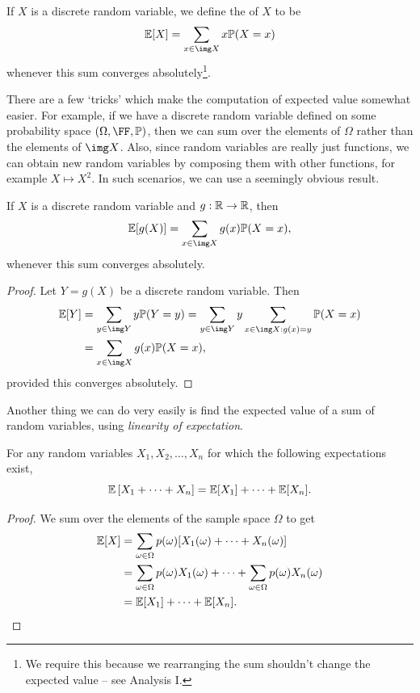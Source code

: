\documentclass[a4paper]{scrartcl}
\begin{document}
\begin{definition}
	If $X$ is a discrete random variable, we define the  of $X$ to be
	$$
\EE[X] = \sum_{x \in \img X} x \PP(X = x)
	$$
	whenever this sum converges absolutely\footnote{We require this because we rearranging the sum shouldn't change the expected value -- see Analysis I.}.
\end{definition}

There are a few `tricks' which make the computation of expected value somewhat easier. For example, if we have a discrete random variable defined on some probability space $(\Omega, \FF, \PP)$, then we can sum over the elements of $\Omega$ rather than the elements of $\img X$.
Also, since random variables are really just functions, we can obtain new random variables by composing them with other functions, for example $X \mapsto X^2$. In such scenarios, we can use a seemingly obvious result.

\begin{theorem}
	If $X$ is a discrete random variable and $g: \mathbb{R} \rightarrow \mathbb{R}$, then
	$$
\EE[g(X)] = \sum_{x \in \img X} g(x) \PP(X = x),
	$$
	whenever this sum converges absolutely.
\end{theorem}
\begin{proof}
	Let $Y = g(X)$ be a discrete random variable. Then
	\begin{align*}
		\EE[Y] &= \sum_{y \in \img Y} y \PP(Y = y) = \sum_{y \in \img Y} y \sum_{x \in \img X : g(x) = y} \PP(X = x)  \\
		&= \sum_{x \in \img X} g(x) \PP(X = x),
	\end{align*}
	provided this converges absolutely.
\end{proof}

Another thing we can do very easily is find the expected value of a sum of random variables, using \emph{linearity of expectation}.

\begin{theorem}
	For any random variables $X_1, X_2, \dots, X_n$ for which the following expectations exist,
	$$
\mathbb{E}\left[X_1 + \cdots + X_n\right]= \mathbb{E}[X_1] + \cdots + \mathbb{E}[X_n].
	$$
\end{theorem}
\begin{proof}
	We sum over the elements of the sample space $\Omega$ to get
	\begin{align*}
		\mathbb{E}[X] &= \sum_{\omega \in \Omega} p(\omega)[X_1(\omega) + \cdots + X_n(\omega)]\\
		&= \sum_{\omega \in \Omega} p(\omega) X_1(\omega) + \cdots + \sum_{\omega \in \Omega} p(\omega) X_n(\omega)\\&= \mathbb{E}[X_1] + \cdots + \mathbb{E}[X_n].
	\end{align*}
\end{proof}
\end{document}
